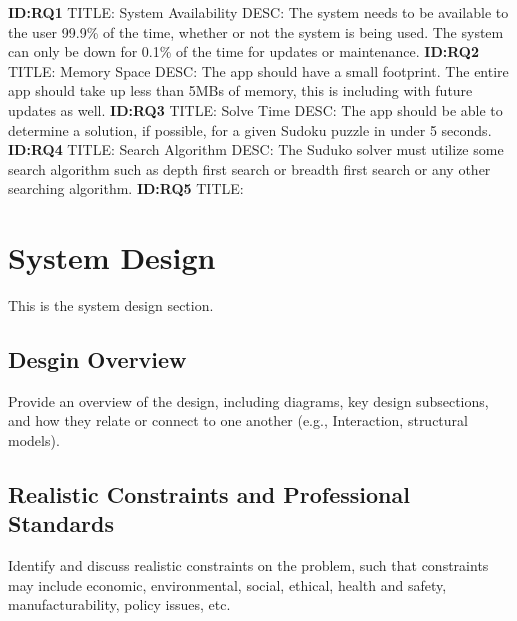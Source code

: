 \documentclass{article}
\begin{document}
\textbf{ID:RQ1} \newline TITLE: System Availability \newline DESC: The system needs to  be available to the user 99.9\% of the time, whether or not the system is being used. The system can only be down for 0.1\% of the time for updates or maintenance. \newline
\textbf{ID:RQ2} \newline TITLE: Memory Space \newline DESC: The app should have a small footprint. The entire app should take up less than 5MBs of memory, this is including with future updates as well.\newline
\textbf{ID:RQ3} \newline TITLE: Solve Time \newline DESC: The app should be able to determine a solution, if possible, for a given Sudoku puzzle in under 5 seconds.\newline
\textbf{ID:RQ4} \newline TITLE: Search Algorithm \newline DESC: The Suduko solver must utilize some search algorithm such as depth first search or breadth first search or any other searching algorithm. \newline
\textbf{ID:RQ5} \newline TITLE: 


\section{System Design}
This is the system design section.

\subsection{Desgin Overview}
Provide an overview of the design, including diagrams, key design subsections, and how they relate or connect to one another (e.g., Interaction, structural models).

\subsection{Realistic Constraints and Professional Standards}
Identify and discuss realistic constraints on the problem, such that constraints may include economic, environmental, social, ethical, health and safety, manufacturability, policy issues, etc.
\end{document}
